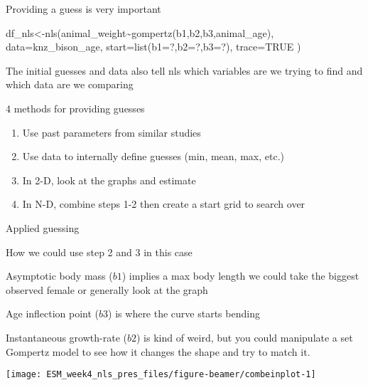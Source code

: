 \documentclass[
  ignorenonframetext,
]{beamer}
\newenvironment{Shaded}{\begin{snugshade}}{\end{snugshade}}
\newcommand{\AttributeTok}[1]{\textcolor[rgb]{0.77,0.63,0.00}{#1}}
\newcommand{\ConstantTok}[1]{\textcolor[rgb]{0.00,0.00,0.00}{#1}}
\newcommand{\FunctionTok}[1]{\textcolor[rgb]{0.00,0.00,0.00}{#1}}
\newcommand{\NormalTok}[1]{#1}
\newcommand{\OtherTok}[1]{\textcolor[rgb]{0.56,0.35,0.01}{#1}}
\newcommand{\SpecialCharTok}[1]{\textcolor[rgb]{0.00,0.00,0.00}{#1}}
\begin{document}
\begin{frame}[fragile]{Providing a guess is very important}
\protect\hypertarget{providing-a-guess-is-very-important}{}
\begin{Shaded}
\begin{Highlighting}[]
\NormalTok{df\_nls}\OtherTok{\textless{}{-}}\FunctionTok{nls}\NormalTok{(animal\_weight}\SpecialCharTok{\textasciitilde{}}\FunctionTok{gompertz}\NormalTok{(b1,b2,b3,animal\_age),   }
            \AttributeTok{data=}\NormalTok{knz\_bison\_age,   }
            \AttributeTok{start=}\FunctionTok{list}\NormalTok{(}\AttributeTok{b1=}\NormalTok{?,}\AttributeTok{b2=}\NormalTok{?,}\AttributeTok{b3=}\NormalTok{?),}
            \AttributeTok{trace=}\ConstantTok{TRUE}\NormalTok{ )}
\end{Highlighting}
\end{Shaded}

The initial guesses and data also tell nls which variables are we trying
to find and which data are we comparing
\end{frame}

\begin{frame}{4 methods for providing guesses}
\protect\hypertarget{methods-for-providing-guesses}{}
\begin{enumerate}
[1)]
\item
  Use past parameters from similar studies
\item
  Use data to internally define guesses (min, mean, max, etc.)
\item
  In 2-D, look at the graphs and estimate
\item
  In N-D, combine steps 1-2 then create a start grid to search over
\end{enumerate}
\end{frame}

\begin{frame}{Applied guessing}
\protect\hypertarget{applied-guessing}{}
\small

How we could use step 2 and 3 in this case

Asymptotic body mass (\(b1\)) implies a max body length we could take
the biggest observed female or generally look at the graph

Age inflection point (\(b3\)) is where the curve starts bending

Instantaneous growth-rate (\(b2\)) is kind of weird, but you could
manipulate a set Gompertz model to see how it changes the shape and try
to match it.

\begin{center}\texttt{[image: ESM\_week4\_nls\_pres\_files/figure-beamer/combeinplot-1]} \end{center}
\end{frame}
\end{document}
